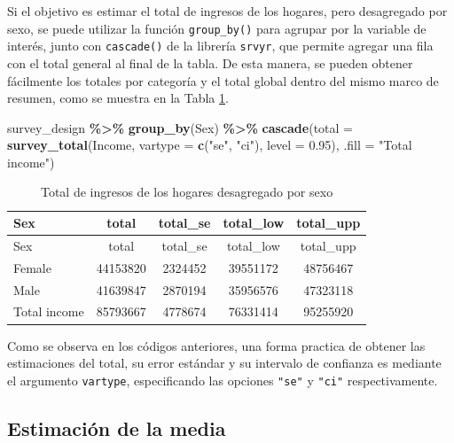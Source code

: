 \documentclass[
  spanish,
  12pt,
]{book}
\newenvironment{Shaded}{\begin{snugshade}}{\end{snugshade}}
\newcommand{\AttributeTok}[1]{\textcolor[rgb]{0.13,0.29,0.53}{#1}}
\newcommand{\FloatTok}[1]{\textcolor[rgb]{0.00,0.00,0.81}{#1}}
\newcommand{\FunctionTok}[1]{\textcolor[rgb]{0.13,0.29,0.53}{\textbf{#1}}}
\newcommand{\NormalTok}[1]{#1}
\newcommand{\SpecialCharTok}[1]{\textcolor[rgb]{0.81,0.36,0.00}{\textbf{#1}}}
\newcommand{\StringTok}[1]{\textcolor[rgb]{0.31,0.60,0.02}{#1}}
\begin{document}
Si el objetivo es estimar el total de ingresos de los hogares, pero desagregado por sexo, se puede utilizar la función \texttt{group\_by()} para agrupar por la variable de interés, junto con \texttt{cascade()} de la librería \texttt{srvyr}, que permite agregar una fila con el total general al final de la tabla. De esta manera, se pueden obtener fácilmente los totales por categoría y el total global dentro del mismo marco de resumen, como se muestra en la Tabla \ref{tab:tab-total-ingreso-sexo}.

\begin{Shaded}
\begin{Highlighting}[]
\NormalTok{survey\_design }\SpecialCharTok{\%\textgreater{}\%}
  \FunctionTok{group\_by}\NormalTok{(Sex) }\SpecialCharTok{\%\textgreater{}\%}
  \FunctionTok{cascade}\NormalTok{(}\AttributeTok{total =} \FunctionTok{survey\_total}\NormalTok{(Income,}
                               \AttributeTok{vartype =} \FunctionTok{c}\NormalTok{(}\StringTok{"se"}\NormalTok{, }\StringTok{"ci"}\NormalTok{),}
                               \AttributeTok{level =} \FloatTok{0.95}\NormalTok{),}
          \AttributeTok{.fill =} \StringTok{"Total income"}\NormalTok{)}
\end{Highlighting}
\end{Shaded}

\begin{longtable}[]{@{}lcccc@{}}
\caption{\label{tab:tab-total-ingreso-sexo}Total de ingresos de los hogares desagregado por sexo}\tabularnewline
\toprule\noalign{}
Sex & total & total\_se & total\_low & total\_upp \\
\midrule\noalign{}
\endfirsthead
\toprule\noalign{}
Sex & total & total\_se & total\_low & total\_upp \\
\midrule\noalign{}
\endhead
\bottomrule\noalign{}
\endlastfoot
Female & 44153820 & 2324452 & 39551172 & 48756467 \\
Male & 41639847 & 2870194 & 35956576 & 47323118 \\
Total income & 85793667 & 4778674 & 76331414 & 95255920 \\
\end{longtable}

Como se observa en los códigos anteriores, una forma practica de obtener las estimaciones del total, su error estándar y su intervalo de confianza es mediante el argumento \texttt{vartype}, especificando las opciones \texttt{"se"} y \texttt{"ci"} respectivamente.

\subsection{Estimación de la media}\label{estimacion-de-la-media}
\end{document}
